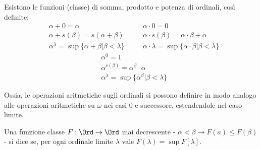 \documentclass[11pt]{scrartcl}
\begin{document}
\begin{corollary}
	Esistono le funzioni (classe) di somma, prodotto e potenza di ordinali, così definite:
	\begin{align*}
		&\alpha + 0 = \alpha &\quad &\alpha \cdot 0 = 0 \\
		&\alpha + s(\beta) = s(\alpha + \beta)  &\quad &\alpha \cdot s(\beta) = \alpha \cdot \beta + \alpha \\
		&\alpha^\lambda = \sup\{\alpha + \beta | \beta < \lambda\} &\quad &\alpha\cdot \lambda = \sup\{\alpha \cdot \beta | \beta < \lambda\}
	\end{align*}
	\begin{align*}
		&\alpha^0 = 1 \\
		&\alpha^{s(\beta)} = \alpha^\beta \cdot \alpha \\
		&\alpha^{\lambda} = \sup\{\alpha^\beta | \beta < \lambda\}
	\end{align*}
\end{corollary}

Ossia, le operazioni aritmetiche sugli ordinali si possono definire in modo analogo alle operazioni aritmetiche su $\omega$ nei casi 0 e successore,
estendendole  nel caso limite.

\begin{definition}[Continuità]
	Una funzione classe $F : \Ord \rightarrow \Ord$ mai decrescente - $\alpha < \beta \rightarrow F(a) \leq F(\beta)$ - si dice  se, per ogni ordinale limite $\lambda$ vale $F(\lambda) = \sup F[\lambda]$.
\end{definition}
\end{document}
